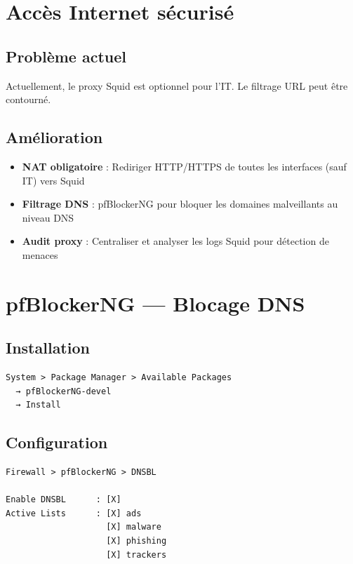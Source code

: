 \section{Accès Internet sécurisé}

\subsection{Problème actuel}

Actuellement, le proxy Squid est optionnel pour l'IT. Le filtrage URL peut être contourné.

\subsection{Amélioration}

\begin{itemize}
    \item \textbf{NAT obligatoire} : Rediriger HTTP/HTTPS de toutes les interfaces (sauf IT) vers Squid
    \item \textbf{Filtrage DNS} : pfBlockerNG pour bloquer les domaines malveillants au niveau DNS
    \item \textbf{Audit proxy} : Centraliser et analyser les logs Squid pour détection de menaces
\end{itemize}

\section{pfBlockerNG — Blocage DNS}

\subsection{Installation}

\begin{lstlisting}
System > Package Manager > Available Packages
  → pfBlockerNG-devel
  → Install
\end{lstlisting}

\subsection{Configuration}

\begin{lstlisting}
Firewall > pfBlockerNG > DNSBL

Enable DNSBL      : [X]
Active Lists      : [X] ads
                    [X] malware
                    [X] phishing
                    [X] trackers
\end{lstlisting}

